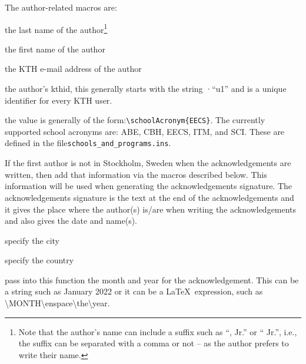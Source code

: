 \documentclass[examplethesis.tex]{subfiles}
\begin{document}
The author-related macros are:
\begin{description}[leftmargin=!, labelwidth =\widthof{\texttt{\textbackslash secondAuthorsFirstname\{\}}}]
\item [\texttt{\textbackslash authorsLastname\{\}}] the last name of the author\footnote{Note that the author's name can include a suffix such as ``, Jr.'' or `` Jr.'', i.e., the suffix can be separated with a comma or not -- as the author prefers to write their name.}

\item [\texttt{\textbackslash authorsFirstname\{\}}] the first name of the author

\item [\texttt{\textbackslash email\{\}}] the KTH e-mail address of the author

\item [\texttt{\textbackslash kthid\{\}}] the author's kthid, this generally starts with the string ·``u1'' and is a unique identifier for every KTH user.

\item [\texttt{\textbackslash authorsSchool\{\}}] the value is generally of the form:\linebreak[4] \texttt{\textbackslash schoolAcronym\{EECS\}}. The currently supported school acronyms are: ABE, CBH, EECS, ITM, and SCI. These are defined in the file\linebreak[4] \texttt{schools\_and\_programs.ins}.
\end{description}

If the first author is not in Stockholm, Sweden when the acknowledgements are written, then add that information via the macros described below.
This information will be used when generating the acknowledgements signature. The acknowledgements signature is the text at the end of the acknowledgements and it gives the place where the author(s) is/are when writing the acknowledgements and also gives the date and name(s).
\begin{description}[leftmargin=!, labelwidth =\widthof{\texttt{\textbackslash secondAuthorsFirstname\{\}}}]
\item [\texttt{\textbackslash authorCity\{A City\}}] specify the city

\item [\texttt{\textbackslash authorCountry\{A Country\}}] specify the country

\item [\texttt{\textbackslash authorCityCountryDate\{\}}] pass into this function the month and year for the acknowledgement. This can be a string such as January 2022 or it can be a \LaTeX\  expression, such as \textbackslash MONTH\textbackslash enspace\textbackslash the\textbackslash year.
\end{description}
\end{document}
